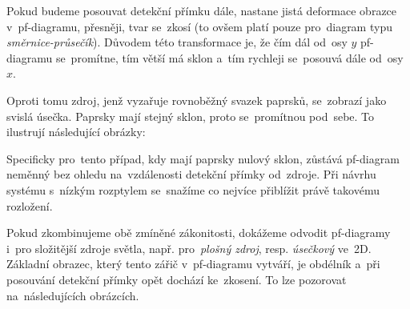 Pokud budeme posouvat detekční přímku dále, nastane jistá deformace obrazce v~pf-diagramu, přesněji, tvar se~zkosí (to ovšem platí pouze pro~diagram typu \emph{směrnice-průsečík}). Důvodem této transformace je, že čím dál od~osy $y$ pf-diagramu se~promítne, tím větší má sklon a~tím rychleji se~posouvá dále od~osy $x$. 


\beautypage

Oproti tomu zdroj, jenž vyzařuje rovnoběžný svazek paprsků, se~zobrazí jako svislá úsečka. Paprsky mají stejný sklon, proto se~promítnou pod~sebe. To ilustrují následující obrázky:



Specificky pro~tento případ, kdy mají paprsky nulový sklon, zůstává pf-diagram neměnný bez ohledu na~vzdálenosti detekční přímky od~zdroje. Při návrhu systému s~nízkým rozptylem se~snažíme co nejvíce přiblížit právě takovému rozložení.

Pokud zkombinujeme obě zmíněné zákonitosti, dokážeme odvodit pf-diagramy i~pro složitější zdroje světla, např. pro~\emph{plošný zdroj}, resp. \emph{úsečkový} ve~2D. Základní obrazec, který tento zářič v~pf-diagramu vytváří, je obdélník a~při posouvání detekční přímky opět dochází ke~zkosení. To lze pozorovat na~následujících obrázcích.


